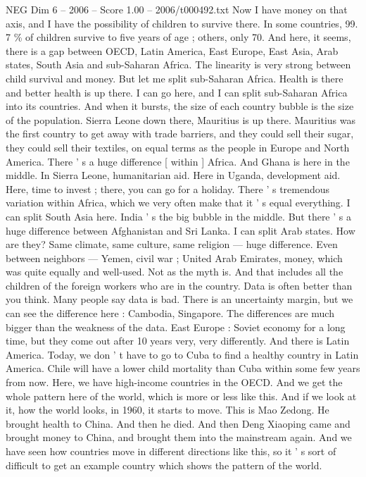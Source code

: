 \begin{textsample}{NEG Dim 6 – 2006 – Score 1.00 – 2006/t000492.txt}
Now I have money on that axis, and I have the possibility of children to survive there.
In some countries, 99. 7 \% of children survive to five years of age ; others, only 70.
And here, it seems, there is a gap between OECD, Latin America, East Europe, East Asia, Arab states, South Asia and sub-Saharan Africa.
The linearity is very strong between child survival and money.
But let me split sub-Saharan Africa.
Health is there and better health is up there.
I can go here, and I can split sub-Saharan Africa into its countries.
And when it bursts, the size of each country bubble is the size of the population.
Sierra Leone down there, Mauritius is up there.
Mauritius was the first country to get away with trade barriers, and they could sell their sugar, they could sell their textiles, on equal terms as the people in Europe and North America.
There ' s a huge difference [ within ] Africa.
And Ghana is here in the middle.
In Sierra Leone, humanitarian aid.
Here in Uganda, development aid.
Here, time to invest ; there, you can go for a holiday.
There ' s tremendous variation within Africa, which we very often make that it ' s equal everything.
I can split South Asia here.
India ' s the big bubble in the middle.
But there ' s a huge difference between Afghanistan and Sri Lanka.
I can split Arab states.
How are they?
Same climate, same culture, same religion — huge difference.
Even between neighbors — Yemen, civil war ; United Arab Emirates, money, which was quite equally and well-used.
Not as the myth is.
And that includes all the children of the foreign workers who are in the country.
Data is often better than you think.
Many people say data is bad.
There is an uncertainty margin, but we can see the difference here : Cambodia, Singapore.
The differences are much bigger than the weakness of the data.
East Europe : Soviet economy for a long time, but they come out after 10 years very, very differently.
And there is Latin America.
Today, we don ' t have to go to Cuba to find a healthy country in Latin America.
Chile will have a lower child mortality than Cuba within some few years from now.
Here, we have high-income countries in the OECD.
And we get the whole pattern here of the world, which is more or less like this.
And if we look at it, how the world looks, in 1960, it starts to move.
This is Mao Zedong.
He brought health to China.
And then he died.
And then Deng Xiaoping came and brought money to China, and brought them into the mainstream again.
And we have seen how countries move in different directions like this, so it ' s sort of difficult to get an example country which shows the pattern of the world.

\end{textsample}
